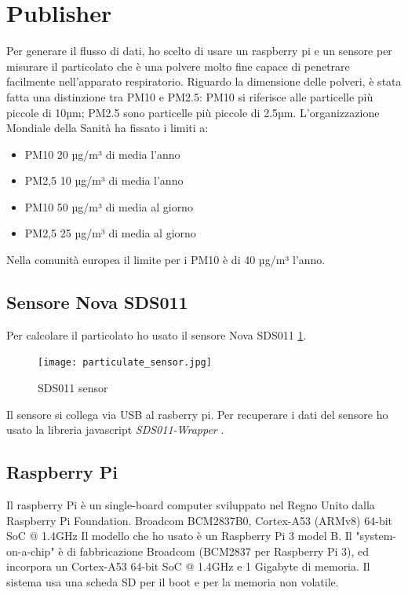\section{Publisher}
Per generare il flusso di dati, ho scelto di usare un raspberry pi e un sensore per misurare il particolato che è una polvere molto fine capace di penetrare facilmente nell'apparato respiratorio.
Riguardo la dimensione delle polveri, è stata fatta una distinzione tra PM10 e PM2.5: PM10 si riferisce alle particelle più piccole di 10µm; PM2.5 sono particelle più piccole di 2.5µm. L'organizzazione Mondiale della Sanità ha fissato i limiti a:
\begin{itemize}
    \item PM10 20 µg/m³ di media l'anno
    \item PM2,5 10 µg/m³ di media l'anno
    \item PM10 50 µg/m³ di media al giorno
    \item PM2,5 25 µg/m³ di media al giorno
\end{itemize}
Nella comunità europea il limite per i PM10 è di 40 µg/m³ l'anno.

\subsection{Sensore Nova SDS011}
Per calcolare il particolato ho usato il sensore Nova SDS011 \ref{fig:sensor}.


\begin{figure}
\begin{center}
  \texttt{[image: particulate\_sensor.jpg]}%
  \caption{SDS011 sensor}
  \label{fig:sensor}
\end{center}
\end{figure}

Il sensore si collega via USB al rasberry pi. Per recuperare i dati del sensore ho usato la libreria javascript \textit{SDS011-Wrapper} \cite{pmSensorGithub}. 



\subsection{Raspberry Pi}
Il raspberry Pi è un single-board computer sviluppato nel Regno Unito dalla Raspberry Pi Foundation. Broadcom BCM2837B0, Cortex-A53 (ARMv8) 64-bit SoC @ 1.4GHz
Il modello che ho usato è un Raspberry Pi 3 model B. Il "system-on-a-chip" è di fabbricazione Broadcom (BCM2837 per Raspberry Pi 3), ed incorpora un Cortex-A53 64-bit SoC @ 1.4GHz e 1 Gigabyte di memoria. Il sistema usa una scheda SD per il boot e per la memoria non volatile.

